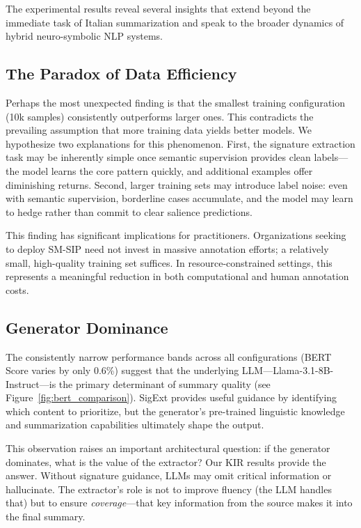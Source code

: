 \documentclass[conference]{IEEEtran}
\begin{document}
The experimental results reveal several insights that extend beyond the immediate task of Italian summarization and speak to the broader dynamics of hybrid neuro-symbolic NLP systems.

\subsection{The Paradox of Data Efficiency}

Perhaps the most unexpected finding is that the smallest training configuration (10k samples) consistently outperforms larger ones. This contradicts the prevailing assumption that more training data yields better models. We hypothesize two explanations for this phenomenon. First, the signature extraction task may be inherently simple once semantic supervision provides clean labels---the model learns the core pattern quickly, and additional examples offer diminishing returns. Second, larger training sets may introduce label noise: even with semantic supervision, borderline cases accumulate, and the model may learn to hedge rather than commit to clear salience predictions.

This finding has significant implications for practitioners. Organizations seeking to deploy SM-SIP need not invest in massive annotation efforts; a relatively small, high-quality training set suffices. In resource-constrained settings, this represents a meaningful reduction in both computational and human annotation costs.

\subsection{Generator Dominance}

The consistently narrow performance bands across all configurations (BERT Score varies by only 0.6\%) suggest that the underlying LLM---Llama-3.1-8B-Instruct---is the primary determinant of summary quality (see Figure~\ref{fig:bert_comparison}). SigExt provides useful guidance by identifying which content to prioritize, but the generator's pre-trained linguistic knowledge and summarization capabilities ultimately shape the output.

This observation raises an important architectural question: if the generator dominates, what is the value of the extractor? Our KIR results provide the answer. Without signature guidance, LLMs may omit critical information or hallucinate. The extractor's role is not to improve fluency (the LLM handles that) but to ensure \textit{coverage}---that key information from the source makes it into the final summary.
\end{document}
